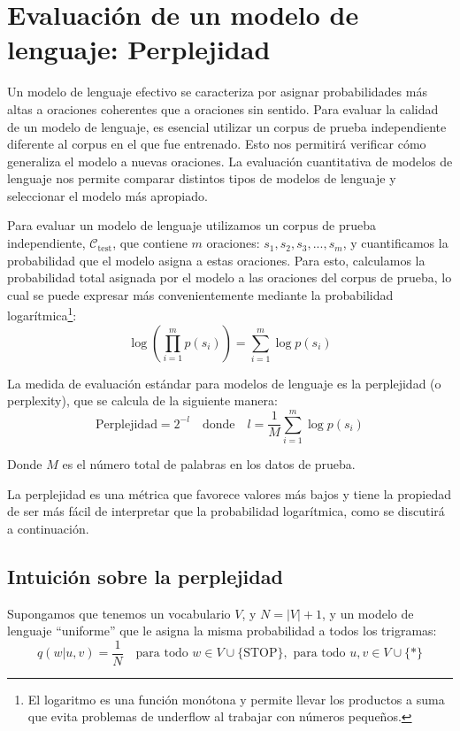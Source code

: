 \section{Evaluación de un modelo de lenguaje: Perplejidad}

Un modelo de lenguaje efectivo se caracteriza por asignar probabilidades más altas a oraciones coherentes que a oraciones sin sentido. Para evaluar la calidad de un modelo de lenguaje, es esencial utilizar un corpus de prueba independiente diferente al corpus en el que fue entrenado. Esto nos permitirá verificar cómo generaliza el modelo a nuevas oraciones.  La evaluación cuantitativa de modelos de lenguaje nos permite comparar distintos tipos de modelos de lenguaje y seleccionar el modelo más apropiado.

Para evaluar un modelo de lenguaje utilizamos un corpus de prueba independiente, $\mathcal{C}_{\text{test}}$, que contiene $m$ oraciones: $s_1, s_2, s_3, ..., s_m$, y cuantificamos la probabilidad que el modelo asigna a estas oraciones. Para esto, calculamos la probabilidad total asignada por el modelo a las oraciones del corpus de prueba, lo cual se puede expresar más convenientemente mediante la probabilidad logarítmica\footnote{El logaritmo es una función monótona y permite llevar los productos a suma que evita problemas de underflow al trabajar con números pequeños.}:
\[
\log \left( \prod_{i=1}^{m} p(s_i) \right) = \sum_{i=1}^{m} \log p(s_i)
\]

La medida de evaluación estándar para modelos de lenguaje es la perplejidad (o perplexity), que se calcula de la siguiente manera:
\[
\text{Perplejidad} = 2^{-l} \quad \text{donde} \quad l = \frac{1}{M} \sum_{i=1}^{m} \log p(s_i)
\]

Donde $M$ es el número total de palabras en los datos de prueba.

La perplejidad es una métrica que favorece valores más bajos y tiene la propiedad de ser más fácil de interpretar que la probabilidad logarítmica, como se discutirá a continuación.


\subsection{Intuición sobre la perplejidad}

Supongamos que tenemos un vocabulario $V$, y $N = |V| + 1$, y un modelo de lenguaje ``uniforme'' que le asigna la misma probabilidad a todos los trigramas:
    \[
        q(w|u, v) = \frac{1}{N} \quad \text{para todo } w \in V \cup \{\text{STOP}\}, \text{ para todo } u, v \in V \cup \{*\}
    \]

